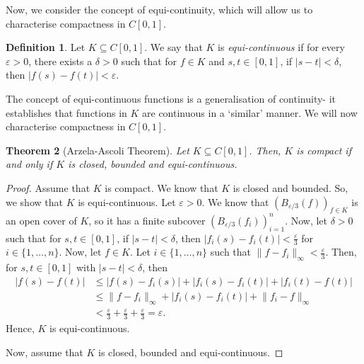 \documentclass[a4paper, openany]{memoir}
\theoremstyle{definition}
\newtheorem{definition}{Definition}[section]
\theoremstyle{plain}
\newtheorem{theorem}[definition]{Theorem}
\begin{document}
    Now, we consider the concept of equi-continuity, which will allow us to characterise compactness in $C[0, 1]$.
    \begin{definition}
        Let $K \subseteq C[0, 1]$. We say that $K$ is \emph{equi-continuous} if for every $\varepsilon > 0$, there exists a $\delta > 0$ such that for $f \in K$ and $s, t \in [0, 1]$, if $|s - t| < \delta$, then $|f(s) - f(t)| < \varepsilon$.
    \end{definition}
    \noindent The concept of equi-continuous functions is a generalisation of continuity- it establishes that functions in $K$ are continuous in a `similar' manner. We will now characterise compactness in $C[0, 1]$.
    \begin{theorem}[Arzela-Ascoli Theorem]
        Let $K \subseteq C[0, 1]$. Then, $K$ is compact if and only if $K$ is closed, bounded and equi-continuous.
    \end{theorem}
    \begin{proof}
        Assume that $K$ is compact. We know that $K$ is closed and bounded. So, we show that $K$ is equi-continuous. Let $\varepsilon > 0$. We know that $(B_{\varepsilon/3}(f))_{f \in K}$ is an open cover of $K$, so it has a finite subcover $(B_{\varepsilon/3}(f_i))_{i=1}^n$. Now, let $\delta > 0$ such that for $s, t \in [0, 1]$, if $|s - t| < \delta$, then $|f_i(s) - f_i(t)| < \frac{\varepsilon}{3}$ for $i \in \{1, \dots, n\}$. Now, let $f \in K$. Let $i \in \{1, \dots, n\}$ such that $\lVert f - f_i \rVert_\infty < \frac{\varepsilon}{3}$. Then, for $s, t \in [0, 1]$ with $|s - t| < \delta$, then
        \begin{align*}
            |f(s) - f(t)| &\leq |f(s) - f_i(s)| + |f_i(s) - f_i(t)| + |f_i(t) - f(t)| \\
            &\leq \lVert f - f_i \rVert_\infty + |f_i(s) - f_i(t)| + \lVert f_i - f \rVert_\infty \\
            &< \frac{\varepsilon}{3} + \frac{\varepsilon}{3} + \frac{\varepsilon}{3} = \varepsilon.
        \end{align*}
        Hence, $K$ is equi-continuous.

        Now, assume that $K$ is closed, bounded and equi-continuous.
    \end{proof}
\end{document}
